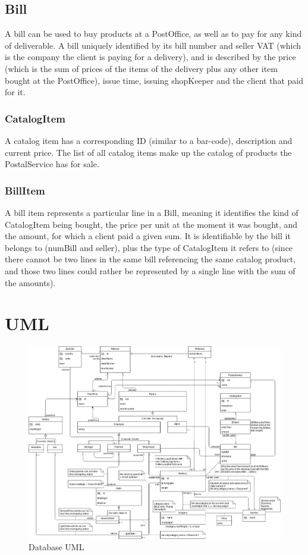 \documentclass{report}[a4paper]
\theoremstyle{remark}
\begin{document}
\subsection{Bill}
A bill can be used to buy products at a PostOffice, as well as to pay for any kind of deliverable. A bill uniquely identified by its bill number and seller VAT (which is the company the client is paying for a delivery), and is described by the price (which is the sum of prices of the items of the delivery plus any other item bought at the PostOffice), issue time, issuing shopKeeper and the client that paid for it.
\subsubsection{CatalogItem}
A catalog item has a corresponding ID (similar to a bar-code), description and current price. The list of all catalog items make up the catalog of products the PostalService has for sale.
\subsubsection{BillItem}
A bill item represents a particular line in a Bill, meaning it identifies the kind of CatalogItem being bought, the price per unit at the moment it was bought, and the amount, for which a client paid a given sum. It is identifiable by the bill it belongs to (numBill and seller), plus the type of CatalogItem it refers to (since there cannot be two lines in the same bill referencing the same catalog product, and those two lines could rather be represented by a single line with the sum of the amounts).
\section{UML}
\begin{figure}[H] \centering
	\includegraphics[angle=-90,scale=0.377]{uml2}
	\caption{Database UML}
\end{figure}
\end{document}
